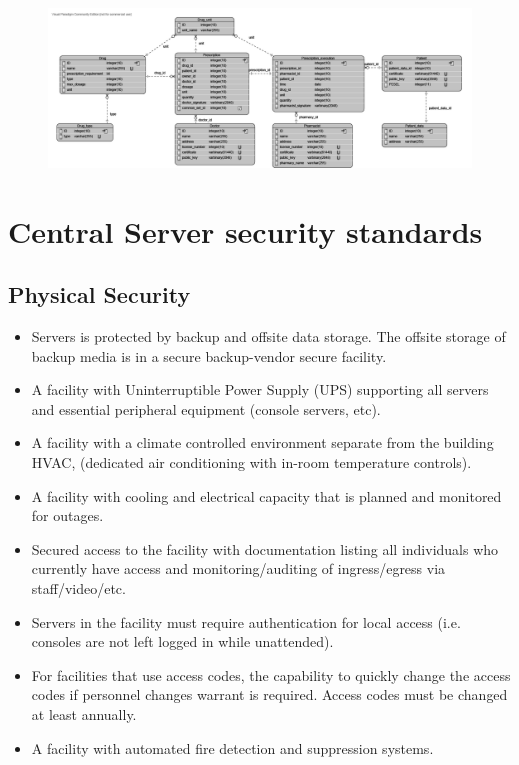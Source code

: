 \begin{figure}[h]
\begin{center}
\includegraphics[width=1.25\textwidth , angle=90]{database/databaseSchema.png}
\end{center}
\end{figure} 

\section{Central Server security standards}
\subsection{Physical Security}
\begin{itemize}
	\item Servers is protected by backup and offsite data storage. The offsite storage of backup media is in a secure backup-vendor secure facility.
	\item A facility with Uninterruptible Power Supply (UPS) supporting all servers and essential peripheral equipment (console servers, etc).
	\item A facility with a climate controlled environment separate from the building HVAC, (dedicated air conditioning with in-room temperature controls).
	\item A facility with cooling and electrical capacity that is planned and monitored for outages.
	\item Secured access to the facility with documentation listing all individuals who currently have access and monitoring/auditing of ingress/egress via staff/video/etc.
	\item Servers in the facility must require authentication for local access (i.e. consoles are not left logged in while unattended).
	\item For facilities that use access codes, the capability to quickly change the access codes if personnel changes warrant is required.  Access codes must be changed at least annually.
	\item A facility with automated fire detection and suppression systems.
\end{itemize}



